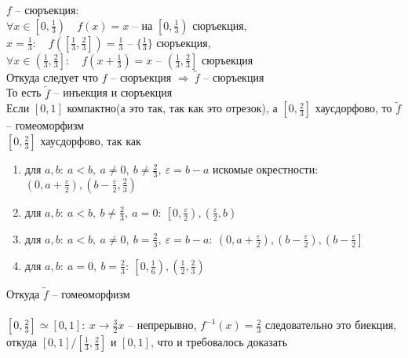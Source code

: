 	 	$f$ -- сюръекция:\\
	 	$\forall x \in \left[0, \frac{1}{3}\right)\quad f(x) = x$ -- на $\left[0, \frac{1}{3}\right)$ сюръекция,\\
	 	$x = \frac{1}{3}:\quad f([\frac{1}{3}, \frac{2}{3}]) = \frac{1}{3}$ -- $\{\frac{1}{3}\}$ сюръекция,\\
	 	$\forall x\in \left(\frac{1}{3}, \frac{2}{3}\right]:\quad f(x + \frac{1}{3}) = x$ --  $\left(\frac{1}{3}, \frac{2}{3}\right]$ сюръекция\\
		Откуда следует что $f$ -- сюръекция $\Rightarrow\ \tilde{f}$ -- сюръекция\\
		То есть $\tilde{f}$ -- инъекция и сюръекция\\
		Если $[0,1]$ компактно(а это так, так как это отрезок), а $[0, \frac{2}{3}]$ хаусдорфово, то $\tilde{f}$ -- гомеоморфизм\\
		$[0, \frac{2}{3}]$ хаусдорфово, так как 
		\begin{enumerate}
			\item 
			для $a,b:\ a<b,\ a\ne 0,\ b \ne \frac{2}{3},\ \varepsilon = b - a$ искомые окрестности: $(0, a + \frac{\varepsilon}{2}), (b - \frac{\varepsilon}{2}, \frac{2}{3})$
			\item 
			для $a,b:\ a<b,\ b \ne \frac{2}{3},\ a = 0:\ \left[0, \frac{\varepsilon}{2}\right), (\frac{\varepsilon}{2}, b)$
			\item 
			для $a,b:\ a<b,\ a\ne 0,\ b = \frac{2}{3},\ \varepsilon = b - a:\ (0, a + \frac{\varepsilon}{2}), (b - \frac{\varepsilon}{2}), \left(b - \frac{\varepsilon}{2}\right]$
			\item 
			для $a,b:\ a = 0,\ b = \frac{2}{3}:\ \left[0, \frac{1}{6}\right), \left(\frac{1}{2}, \frac{2}{3}\right)$
		\end{enumerate}
		Откуда $\tilde{f}$ -- гомеоморфизм\\
		\\
		$[0, \frac{2}{3}] \simeq [0,1]:\ x \to \frac{3}{2}x$ -- непрерывно, $f^{-1}(x) = \frac{2}{3}$ следовательно это биекция, откуда $[0,1] /\left[\frac{1}{3}, \frac{2}{3}\right]$ и $[0,1]$, что и требовалось доказать\\
		\\
		
